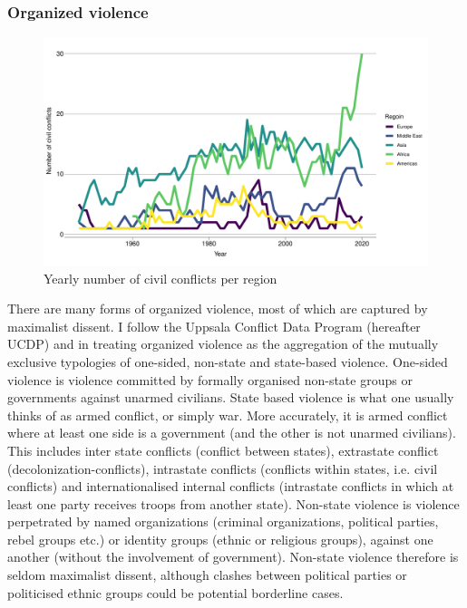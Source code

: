 \subsubsection{Organized violence}
\label{Organized violence}

\begin{figure}[hbpt]
	\centering
	\includegraphics[width=\textwidth]{../R/Output/civilConflictRegion.pdf}
	\caption{Yearly number of civil conflicts per region}
	\label{civilConflictRegion}
\end{figure}

There are many forms of organized violence, most of which are captured by
maximalist dissent. I follow the Uppsala Conflict Data Program (hereafter UCDP)
and \citet{Melander_2016} in treating organized violence as the aggregation of
the mutually exclusive typologies of one-sided, non-state and state-based
violence. One-sided violence is violence committed by formally organised
non-state groups or governments against unarmed civilians. State based violence
is what one usually thinks of as armed conflict, or simply war. More accurately,
it is armed conflict where at least one side is a government (and the other is
not unarmed civilians). This includes inter state conflicts (conflict between
states), extrastate conflict (decolonization-conflicts), intrastate conflicts
(conflicts within states, i.e. civil conflicts) and internationalised internal
conflicts (intrastate conflicts in which at least one party receives troops from
another state). Non-state violence is violence perpetrated by named
organizations (criminal organizations, political parties, rebel groups etc.) or
identity groups (ethnic or religious groups), against one another (without the
involvement of government). Non-state violence therefore is seldom maximalist
dissent, although clashes between political parties or politicised ethnic groups
could be potential borderline cases.

